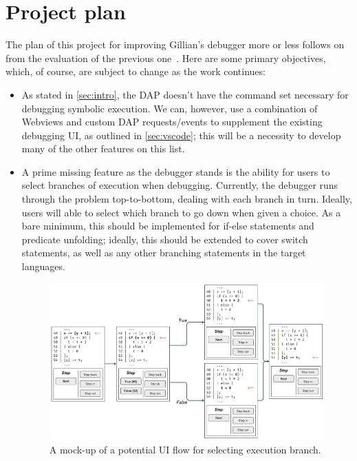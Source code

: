 
\chapter{Project plan}
\label{cha:plan}

The plan of this project for improving Gillian's debugger 
more or less follows on from the
evaluation of the previous one~\cite{gillian-debugging-2021}. Here are some
primary objectives, which, of course, are subject to change as the
work continues:

\begin{itemize}

  \item As stated in \autoref{sec:intro}, the DAP doesn't have the command set
        necessary for debugging symbolic execution. We can, however, use a
        combination of Webviews and custom DAP requests/events to supplement
        the existing debugging UI, as outlined in \autoref{sec:vscode}; this
        will be a necessity to develop many of the other features on this list.

  \item A prime missing feature as the debugger stands is the ability for users
        to select branches of execution when debugging. Currently, the debugger
        runs through the problem top-to-bottom, dealing with each branch in
        turn. Ideally, users will able to select which branch to go down when
        given a choice. As a bare minimum, this should be implemented for
        if-else statements and predicate unfolding; ideally, this should be 
        extended to cover switch statements, as well as any other branching 
        statements in the target languages.

\begin{figure}
  \noindent
    \includegraphics[width=\textwidth]{img/branch-selection-mockup.png}
  \caption{A mock-up of a potential UI flow for selecting execution branch.}
  \label{fig:branch-selection-mockup}
\end{figure}


\end{itemize}
